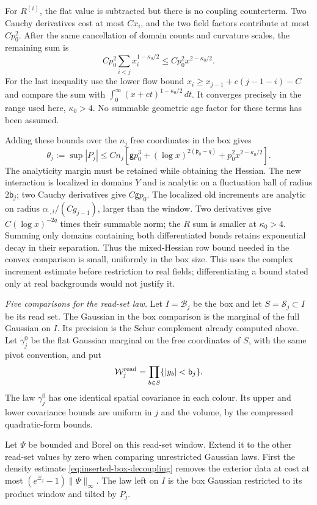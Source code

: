 \documentclass[11pt,letterpaper,reqno]{amsart}
\theoremstyle{definition}
\theoremstyle{remark}
\begin{document}
For $R^{(i)}$, the flat value is subtracted but there is no
coupling counterterm. Two Cauchy derivatives cost at most $Cx_i$,
and the two field factors contribute at most $Cp_0^2$. After
the same cancellation of domain counts and curvature scales, the
remaining sum is
\[
 Cp_0^2\sum_{i<j}x_i^{1-\kappa_0/2}
                      \le Cp_0^2x^{2-\kappa_0/2}.
\]
For the last inequality use the lower flow bound
$x_i\ge x_{j-1}+c(j-1-i)-C$ and compare the sum with
$\int_0^\infty(x+ct)^{1-\kappa_0/2}\,dt$.
It converges precisely in the range used here, $\kappa_0>4$.
No summable geometric age factor for these terms has been assumed.

Adding these bounds over the $n_j$ free coordinates in the box
gives
\begin{equation}\label{eq:inserted-tilt-size}
 \theta_j:=\sup|P_j|
 \le Cn_j\left[
  \mathsf g p_0^3+(\log x)^{2(\mathfrak p_0-q)}
                     +p_0^2x^{2-\kappa_0/2}\right].
\end{equation}
The analyticity margin must be retained while obtaining the
Hessian. The new interaction is localized in domains $Y$ and is
analytic on a fluctuation ball of radius $2\mathsf b_j$; two
Cauchy derivatives give $C\mathsf g p_0$. The localized old
increments are analytic on radius
$\alpha_{\cdot,i}/(Cg_{j-1})$, larger than the window. Two
derivatives give $C(\log x)^{-2q}$ times their summable norm;
the $R$ sum is smaller at $\kappa_0>4$. Summing only domains
containing both differentiated bonds retains exponential decay
in their separation. Thus the mixed-Hessian row bound needed in
the convex comparison is small, uniformly in the box size. This
uses the complex increment estimate before restriction to real
fields; differentiating a bound stated only at real backgrounds
would not justify it.

\emph{Five comparisons for the read-set law.}
Let $I=\mathcal B_j$ be the box and let
$S=\mathcal S_j\subset I$ be its read set. The Gaussian in
the box comparison is the marginal of the full Gaussian on $I$.
Its precision is the Schur complement already computed above.
Let $\gamma_j^0$ be the flat Gaussian marginal on the free
coordinates of $S$, with the same pivot convention, and put
\[
 \mathcal W_j^{\rm read}
       =\prod_{b\in S}\{|y_b|<\mathsf b_j\}.
\]
The law $\gamma_j^0$ has one identical spatial covariance in
each colour. Its upper and lower covariance bounds are uniform
in $j$ and the volume, by the compressed quadratic-form bounds.

Let $\Psi$ be bounded and Borel on this read-set window.
Extend it to the other read-set values by zero when comparing
unrestricted Gaussian laws. First the density estimate
\eqref{eq:inserted-box-decoupling} removes the exterior data
at cost at most
$(e^{\Xi_j}-1)\|\Psi\|_\infty$. The law left on $I$ is
the box Gaussian restricted to its product window and tilted
by $P_j$.
\end{document}
